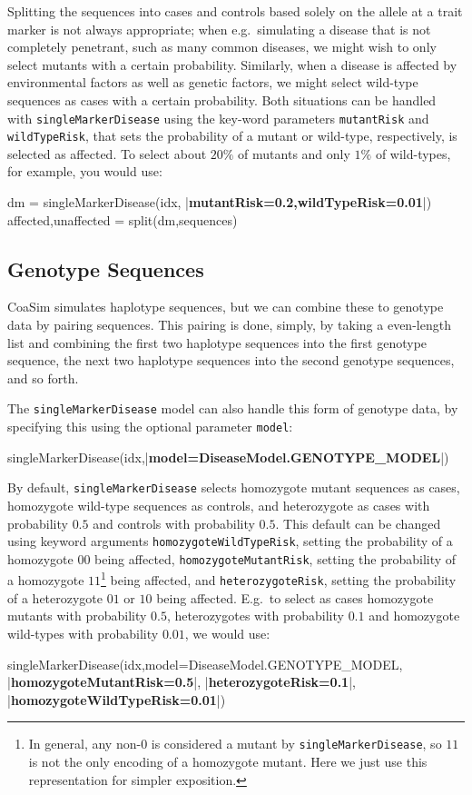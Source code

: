 \documentclass{manual}
\begin{document}
\begin{empfile}
Splitting the sequences into cases and controls based solely on the
allele at a trait marker is not always appropriate; when e.g.\
simulating a disease that is not completely penetrant, such as many
common diseases, we might wish to only select mutants with a certain
probability.  Similarly, when a disease is affected by environmental
factors as well as genetic factors, we might select wild-type
sequences as cases with a certain probability.  Both situations can be
handled with \texttt{singleMarkerDisease} using the key-word
parameters \texttt{mutantRisk} and \texttt{wildTypeRisk}, that sets
the probability of a mutant or wild-type, respectively, is selected as
affected.  To select about $20\%$ of mutants and only $1\%$ of
wild-types, for example, you would use:
\begin{code}
dm = singleMarkerDisease(idx, |\textbf{mutantRisk=0.2,wildTypeRisk=0.01}|)
affected,unaffected = split(dm,sequences)
\end{code}



\subsection{Genotype Sequences}
\label{sec:genotype-sequ}
 
CoaSim simulates haplotype sequences, but we can combine these to
genotype data by pairing sequences.  This pairing is done, simply, by
taking a even-length list and combining the first two haplotype
sequences into the first genotype sequence, the next two haplotype
sequences into the second genotype sequences, and so forth.

The \texttt{singleMarkerDisease} model can also handle this form of
genotype data, by specifying this using the optional parameter
\texttt{model}:
\begin{code}
singleMarkerDisease(idx,|\textbf{model=DiseaseModel.GENOTYPE\_MODEL}|)
\end{code}

By default, \texttt{singleMarkerDisease} selects homozygote mutant
sequences as cases, homozygote wild-type sequences as controls, and
heterozygote as cases with probability $0.5$ and controls with
probability $0.5$.  This default can be changed using keyword
arguments \texttt{homozygoteWildTypeRisk}, setting the probability of
a homozygote $00$ being affected, \texttt{homozygoteMutantRisk},
setting the probability of a homozygote $11$\footnote{In general, any
non-$0$ is considered a mutant by \texttt{singleMarkerDisease}, so
$11$ is not the only encoding of a homozygote mutant.  Here we just
use this representation for simpler exposition.} being affected, and
\texttt{heterozygoteRisk}, setting the probability of a heterozygote
$01$ or $10$ being affected.  E.g.\ to select as cases homozygote
mutants with probability $0.5$, heterozygotes with probability $0.1$
and homozygote wild-types with probability $0.01$, we would use:
\begin{code}
singleMarkerDisease(idx,model=DiseaseModel.GENOTYPE_MODEL,
                    |\textbf{homozygoteMutantRisk=0.5}|,
                    |\textbf{heterozygoteRisk=0.1}|,
		    |\textbf{homozygoteWildTypeRisk=0.01}|)
\end{code}


\end{empfile}
\end{document}
